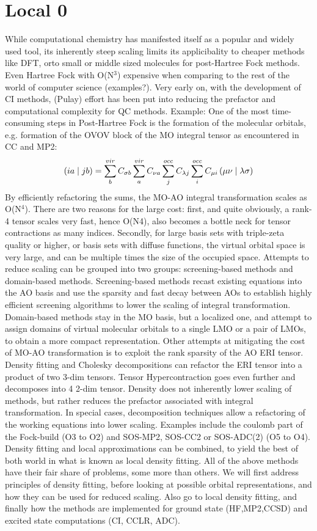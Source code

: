\chapter{Local 0}

While computational chemistry has manifested itself as a popular and widely used tool, its inherently steep scaling limits its applicibality to cheaper methods like DFT, orto small or middle sized molecules for post-Hartree Fock methods. Even Hartree Fock with O(N$^3$) expensive when comparing to the rest of the world of computer science (examples?). Very early on, with the development of CI methods, (Pulay) effort has been put into reducing the prefactor and computational complexity for QC methods. Example: One of the most time-consuming steps in Post-Hartree Fock is the formation of the molecular orbitals, e.g. formation of the OVOV block of the MO integral tensor as encountered in CC and MP2:
\begin{equation}
\left( ia \mid jb \right) = \sum^{vir}_b C_{\sigma b} \sum^{vir}_a C_{\nu a} \sum^{occ}_j C_{\lambda j} \sum^{occ}_i C_{\mu i} \left( \mu\nu \mid \lambda\sigma \right)
\end{equation}
By efficiently refactoring the sums, the MO-AO integral transformation scales as O(N$^4$). There are two reasons for the large cost: first, and quite obviously, a rank-4 tensor scales very fast, hence O(N4), also becomes a bottle neck for tensor contractions as many indices. Secondly, for large basis sets with triple-zeta quality or higher, or basis sets with diffuse functions, the virtual orbital space is very large, and can be multiple times the size of the occupied space. 
Attempts to reduce scaling can be grouped into two groups: screening-based methods and domain-based methods. Screening-based methods recast existing equations into the AO basis and use the sparsity and fast decay between AOs to establish highly efficient screening algorithms to lower the scaling of integral transformation. Domain-based methods stay in the MO basis, but a localized one, and attempt to assign domains of virtual molecular orbitals to a single LMO or a pair of LMOs, to obtain a more compact representation. 
Other attempts at mitigating the cost of MO-AO transformation is to exploit the rank sparsity of the AO ERI tensor. Density fitting and Cholesky decompositions can refactor the ERI tensor into a product of two 3-dim tensors. Tensor Hypercontraction goes even further and decomposes into 4 2-dim tensor. Density does not inherently lower scaling of methods, but rather reduces the prefactor associated with integral transformation. In special cases, decomposition techniques allow a refactoring of the working equations into lower scaling. Examples include the coulomb part of the Fock-build (O3 to O2) and SOS-MP2, SOS-CC2 or SOS-ADC(2) (O5 to O4).  
Density fitting and local approximations can be combined, to yield the best of both world in what is known as local density fitting.
All of the above methods have their fair share of problems, some more than others. We will first address principles of density fitting, before looking at possible orbital representations, and how they can be used for reduced scaling. Also go to local density fitting, and finally how the methods are implemented for ground state (HF,MP2,CCSD) and excited state computations (CI, CCLR, ADC).

